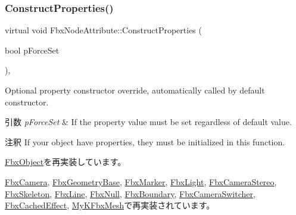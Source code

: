 \subsubsection{\texorpdfstring{Construct\+Properties()}{ConstructProperties()}}
{\footnotesize\ttfamily virtual void Fbx\+Node\+Attribute\+::\+Construct\+Properties (\begin{DoxyParamCaption}\item[{bool}]{p\+Force\+Set }\end{DoxyParamCaption})\hspace{0.3cm}{\ttfamily [protected]}, {\ttfamily [virtual]}}

Optional property constructor override, automatically called by default constructor. 
\begin{DoxyParams}{引数}
{\em p\+Force\+Set} & If the property value must be set regardless of default value. \\
\hline
\end{DoxyParams}
\begin{DoxyRemark}{注釈}
If your object have properties, they must be initialized in this function. 
\end{DoxyRemark}


\hyperlink{class_fbx_object_ad44f814323dc1b5e78bff1bfc608b4bb}{Fbx\+Object}を再実装しています。



\hyperlink{class_fbx_camera_a11334e5358efacbd87e4a7d78036155d}{Fbx\+Camera}, \hyperlink{class_fbx_geometry_base_a94ee142ac1d40be3aebb4d9441431921}{Fbx\+Geometry\+Base}, \hyperlink{class_fbx_marker_a02a9ec30c7dc256cce288e2f9961b507}{Fbx\+Marker}, \hyperlink{class_fbx_light_aaa406a871272d3f36c6300ab81f312c5}{Fbx\+Light}, \hyperlink{class_fbx_camera_stereo_a83a9b1ee59d0014b30411fe4877b5dec}{Fbx\+Camera\+Stereo}, \hyperlink{class_fbx_skeleton_aa1e8d4dbe577415b4e00914ae75d46a0}{Fbx\+Skeleton}, \hyperlink{class_fbx_line_a48df4b6cd889814d3fe7ca5bb09bcc78}{Fbx\+Line}, \hyperlink{class_fbx_null_a5074b9c24389b6b0017e156566469421}{Fbx\+Null}, \hyperlink{class_fbx_boundary_acb50e021b1e9920026c975613a949537}{Fbx\+Boundary}, \hyperlink{class_fbx_camera_switcher_a38011053f3a61df4e93989d7c970fa16}{Fbx\+Camera\+Switcher}, \hyperlink{class_fbx_cached_effect_a0a33b753735747046809b241eadb19d2}{Fbx\+Cached\+Effect}, \hyperlink{class_my_k_fbx_mesh_a9fc01e7c17e2e1456cf7859f05d253e8}{My\+K\+Fbx\+Mesh}で再実装されています。

\mbox{\label{class_fbx_node_attribute_a1c2116756906127145a2b8721fc26752}} 
